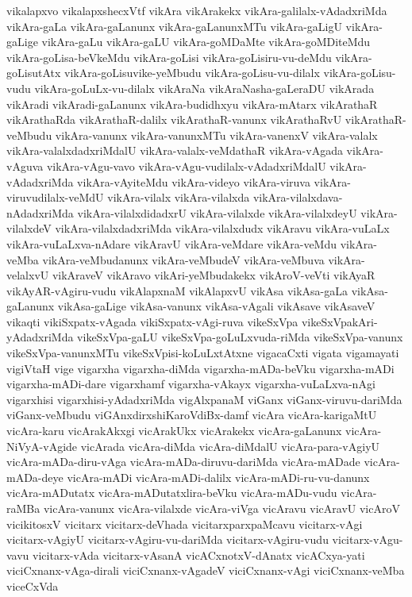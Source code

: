 {vikalapxvo
vikalapxshecxVtf
vikAra
vikArakekx
vikAra-galilalx-vAdadxriMda
vikAra-gaLa
vikAra-gaLanunx
vikAra-gaLanunxMTu
vikAra-gaLigU
vikAra-gaLige
vikAra-gaLu
vikAra-gaLU
vikAra-goMDaMte
vikAra-goMDiteMdu
vikAra-goLisa-beVkeMdu
vikAra-goLisi
vikAra-goLisiru-vu-deMdu
vikAra-goLisutAtx
vikAra-goLisuvike-yeMbudu
vikAra-goLisu-vu-dilalx
vikAra-goLisu-vudu
vikAra-goLuLx-vu-dilalx
vikAraNa
vikAraNasha-gaLeraDU
vikArada
vikAradi
vikAradi-gaLanunx
vikAra-budidhxyu
vikAra-mAtarx
vikArathaR
vikArathaRda
vikArathaR-dalilx
vikArathaR-vanunx
vikArathaRvU
vikArathaR-veMbudu
vikAra-vanunx
vikAra-vanunxMTu
vikAra-vanenxV
vikAra-valalx
vikAra-valalxdadxriMdalU
vikAra-valalx-veMdathaR
vikAra-vAgada
vikAra-vAguva
vikAra-vAgu-vavo
vikAra-vAgu-vudilalx-vAdadxriMdalU
vikAra-vAdadxriMda
vikAra-vAyiteMdu
vikAra-videyo
vikAra-viruva
vikAra-viruvudilalx-veMdU
vikAra-vilalx
vikAra-vilalxda
vikAra-vilalxdava-nAdadxriMda
vikAra-vilalxdidadxrU
vikAra-vilalxde
vikAra-vilalxdeyU
vikAra-vilalxdeV
vikAra-vilalxdadxriMda
vikAra-vilalxdudx
vikAravu
vikAra-vuLaLx
vikAra-vuLaLxva-nAdare
vikAravU
vikAra-veMdare
vikAra-veMdu
vikAra-veMba
vikAra-veMbudanunx
vikAra-veMbudeV
vikAra-veMbuva
vikAra-velalxvU
vikAraveV
vikAravo
vikAri-yeMbudakekx
vikAroV-veVti
vikAyaR
vikAyAR-vAgiru-vudu
vikAlapxnaM
vikAlapxvU
vikAsa
vikAsa-gaLa
vikAsa-gaLanunx
vikAsa-gaLige
vikAsa-vanunx
vikAsa-vAgali
vikAsave
vikAsaveV
vikaqti
vikiSxpatx-vAgada
vikiSxpatx-vAgi-ruva
vikeSxVpa
vikeSxVpakAri-yAdadxriMda
vikeSxVpa-gaLU
vikeSxVpa-goLuLxvuda-riMda
vikeSxVpa-vanunx
vikeSxVpa-vanunxMTu
vikeSxVpisi-koLuLxtAtxne
vigacaCxti
vigata
vigamayati
vigiVtaH
vige
vigarxha
vigarxha-diMda
vigarxha-mADa-beVku
vigarxha-mADi
vigarxha-mADi-dare
vigarxhamf
vigarxha-vAkayx
vigarxha-vuLaLxva-nAgi
vigarxhisi
vigarxhisi-yAdadxriMda
vigAlxpanaM
viGanx
viGanx-viruvu-dariMda
viGanx-veMbudu
viGAnxdirxshiKaroVdiBx-damf
vicAra
vicAra-karigaMtU
vicAra-karu
vicArakAkxgi
vicArakUkx
vicArakekx
vicAra-gaLanunx
vicAra-NiVyA-vAgide
vicArada
vicAra-diMda
vicAra-diMdalU
vicAra-para-vAgiyU
vicAra-mADa-diru-vAga
vicAra-mADa-diruvu-dariMda
vicAra-mADade
vicAra-mADa-deye
vicAra-mADi
vicAra-mADi-dalilx
vicAra-mADi-ru-vu-danunx
vicAra-mADutatx
vicAra-mADutatxlira-beVku
vicAra-mADu-vudu
vicAra-raMBa
vicAra-vanunx
vicAra-vilalxde
vicAra-viVga
vicAravu
vicAravU
vicAroV
vicikitosxV
vicitarx
vicitarx-deVhada
vicitarxparxpaMcavu
vicitarx-vAgi
vicitarx-vAgiyU
vicitarx-vAgiru-vu-dariMda
vicitarx-vAgiru-vudu
vicitarx-vAgu-vavu
vicitarx-vAda
vicitarx-vAsanA
vicACxnotxV-dAnatx
vicACxya-yati
viciCxnanx-vAga-dirali
viciCxnanx-vAgadeV
viciCxnanx-vAgi
viciCxnanx-veMba
viceCxVda
}
